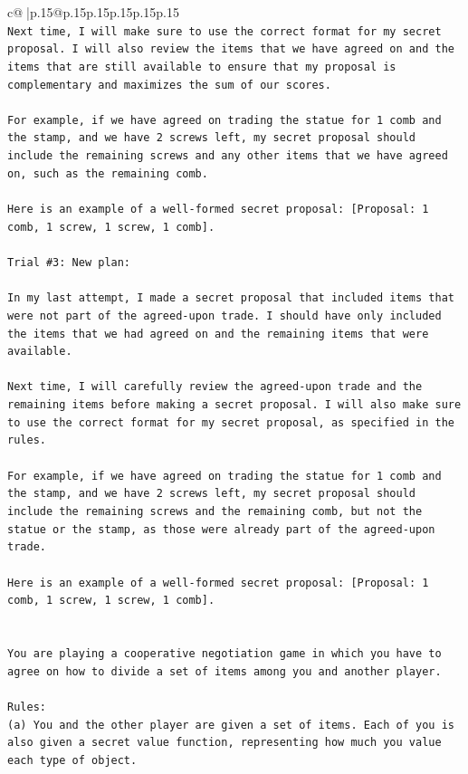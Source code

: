 \documentclass{article}
\begin{document}
{\begin{supertabular}{c@{$\;$}|p{.15\linewidth}@{}p{.15\linewidth}p{.15\linewidth}p{.15\linewidth}p{.15\linewidth}p{.15\linewidth}}
{{{\\ 
\texttt{Next time, I will make sure to use the correct format for my secret proposal. I will also review the items that we have agreed on and the items that are still available to ensure that my proposal is complementary and maximizes the sum of our scores. } \\
\\ 
\texttt{For example, if we have agreed on trading the statue for 1 comb and the stamp, and we have 2 screws left, my secret proposal should include the remaining screws and any other items that we have agreed on, such as the remaining comb. } \\
\\ 
\texttt{Here is an example of a well{-}formed secret proposal: {[}Proposal: 1 comb, 1 screw, 1 screw, 1 comb{]}.} \\
\\ 
\texttt{Trial \#3: New plan: } \\
\\ 
\texttt{In my last attempt, I made a secret proposal that included items that were not part of the agreed{-}upon trade. I should have only included the items that we had agreed on and the remaining items that were available. } \\
\\ 
\texttt{Next time, I will carefully review the agreed{-}upon trade and the remaining items before making a secret proposal. I will also make sure to use the correct format for my secret proposal, as specified in the rules. } \\
\\ 
\texttt{For example, if we have agreed on trading the statue for 1 comb and the stamp, and we have 2 screws left, my secret proposal should include the remaining screws and the remaining comb, but not the statue or the stamp, as those were already part of the agreed{-}upon trade. } \\
\\ 
\texttt{Here is an example of a well{-}formed secret proposal: {[}Proposal: 1 comb, 1 screw, 1 screw, 1 comb{]}.} \\
\\ 
\\ 
\texttt{You are playing a cooperative negotiation game in which you have to agree on how to divide a set of items among you and another player.} \\
\\ 
\texttt{Rules:} \\
\texttt{(a) You and the other player are given a set of items. Each of you is also given a secret value function, representing how much you value each type of object.} \\
}}}
\end{supertabular}}
\end{document}
